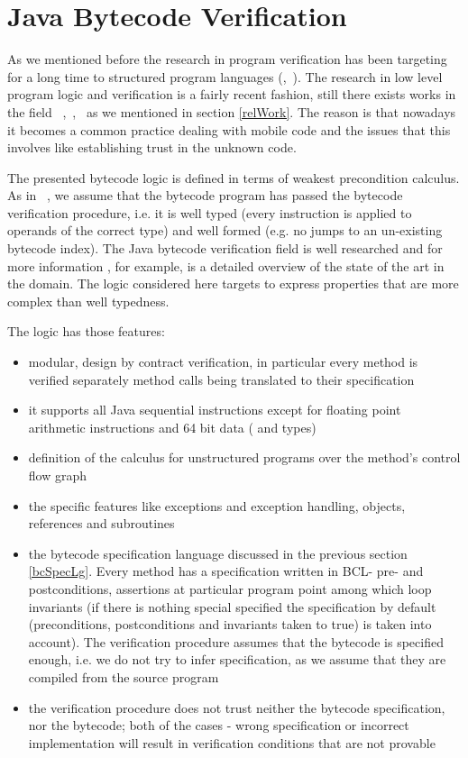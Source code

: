 
\section{Java Bytecode Verification}\label{verifCond}
As we mentioned before the research in program verification has been targeting for a long time to structured program languages (\cite{WPCDS},~\cite{DisDij}). 
The research in low level program logic and verification is a fairly recent fashion, still there exists works in the field ~\cite{B04tlsj},~\cite{BM05plb},~\cite{Quigley} as we mentioned in section \ref{relWork}.
The reason is that nowadays it becomes a common practice dealing with mobile code and the issues that this involves like 
establishing trust in the unknown code. 

The presented bytecode logic is defined in terms of weakest precondition calculus. As in ~\cite{BM05plb}, we assume 
that the bytecode program has passed the bytecode verification procedure, i.e. it is well typed 
(every instruction is applied to operands of the correct type) and well formed 
(e.g. no jumps to an un-existing bytecode index). The Java bytecode verification field is  well researched and 
for more information \cite{Ljbc}, for example, is a detailed overview of the state of the art in the domain. 
The logic considered here targets to express properties that are more complex than well typedness.

The logic has those features:
\begin{itemize}
\item modular, design by contract verification, in particular every method is verified separately method calls being translated to their specification 
\item it supports all Java sequential instructions except for floating point arithmetic instructions and 64 bit data ( and  types)
\item definition of the calculus for unstructured programs over the method's control flow graph
\item the specific features like exceptions and exception handling, objects, references and subroutines
\item the bytecode specification language discussed in the previous section \ref{bcSpecLg}. Every method has a specification written 
in BCL- pre- and postconditions, assertions at particular program point among 
which loop invariants (if there is nothing special specified the specification by default (preconditions, postconditions and invariants taken to true) is taken into account). The verification procedure assumes that the bytecode is specified enough, i.e. we do not try to infer specification, as we assume that they are compiled from the source program
\item the verification procedure does not trust neither the bytecode specification, nor the bytecode; both of the cases - wrong 
specification or incorrect implementation will result in verification conditions that are not provable 
\end{itemize}

